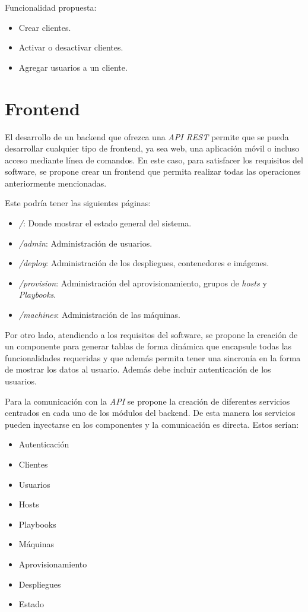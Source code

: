 \bigskip
Funcionalidad propuesta:
\begin{itemize}
	\item Crear clientes.
	\item Activar o desactivar clientes.
	\item Agregar usuarios a un cliente.
\end{itemize}




\section{Frontend}
\label{sec:frontcap6}

El desarrollo de un backend que ofrezca una \textit{API REST} permite que se pueda desarrollar cualquier tipo de frontend, ya sea web, una aplicación móvil o incluso acceso mediante línea de comandos. En este caso, para satisfacer los requisitos del software, se propone crear un frontend que permita realizar todas las operaciones anteriormente mencionadas.

\bigskip
Este podría tener las siguientes páginas:
\begin{itemize}
	\item \textit{/}: Donde mostrar el estado general del sistema.
	\item \textit{/admin}: Administración de usuarios.
	\item \textit{/deploy}: Administración de los despliegues, contenedores e imágenes.
	\item \textit{/provision}: Administración del aprovisionamiento, grupos de \textit{hosts} y \textit{Playbooks}.
	\item \textit{/machines}: Administración de las máquinas.
\end{itemize}

\bigskip
Por otro lado, atendiendo a los requisitos del software, se propone la creación de un componente para generar tablas de forma dinámica que encapsule todas las funcionalidades requeridas y que además permita tener una sincronía en la forma de mostrar los datos al usuario. Además debe incluir autenticación de los usuarios.

Para la comunicación con la \textit{API} se propone la creación de diferentes servicios centrados en cada uno de los módulos del backend. De esta manera los servicios pueden inyectarse en los componentes y la comunicación es directa. Estos serían:
\begin{itemize}
	\item Autenticación
	\item Clientes
	\item Usuarios
	\item Hosts
	\item Playbooks
	\item Máquinas
	\item Aprovisionamiento
	\item Despliegues
	\item Estado
\end{itemize}

